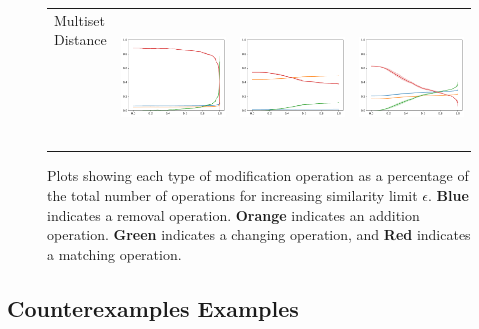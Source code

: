 \begin{figure}
\begin{tabular}{lccc}
\shortstack{Multiset\\Distance\\\text{ }\\\text{ }\\\text{ }\\\text{ }\\\text{ }\\\text{ }}       & \includegraphics[width=.25\linewidth]{code/img/operation_count_ms_AT1.pdf}  & \includegraphics[width=.25\linewidth]{code/img/operation_count_ms_AT1-2.pdf}  & \includegraphics[width=.25\linewidth]{code/img/operation_count_ms_AT2.pdf}
\end{tabular}
\caption{Plots showing each type of modification operation as a percentage of the total number of operations for increasing similarity limit $\epsilon$. {\color{color1} \textbf{Blue}} indicates a removal operation. {\color{color2} \textbf{Orange}} indicates an addition operation. {\color{color3} \textbf{Green}} indicates a changing operation, and {\color{color4} \textbf{Red}} indicates a matching operation. }
\label{fig:operations}
\end{figure}





\subsection{Counterexamples Examples}
\label{ssec:results-examples}

